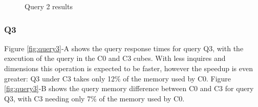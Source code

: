 \begin{figure}[H]
  \caption{Query 2 results}\label{fig:query2}
  \vspace{6mm}
  \begin{center}
  \end{center}
  \vspace{2mm}
\end{figure}

\hypertarget{q3-1}{%
\subsubsection{Q3}\label{q3-1}}

Figure \ref{fig:query3}-A shows the query response times for query Q3, with the execution of the query in the C0 and C3 cubes.
With less inquires and dimensions this operation is expected to be faster, however the speedup is even greater: Q3 under C3 takes only 12\% of the memory used by C0.
Figure \ref{fig:query3}-B shows the query memory difference between C0 and C3 for query Q3, with C3 needing only 7\% of the memory used by C0.

